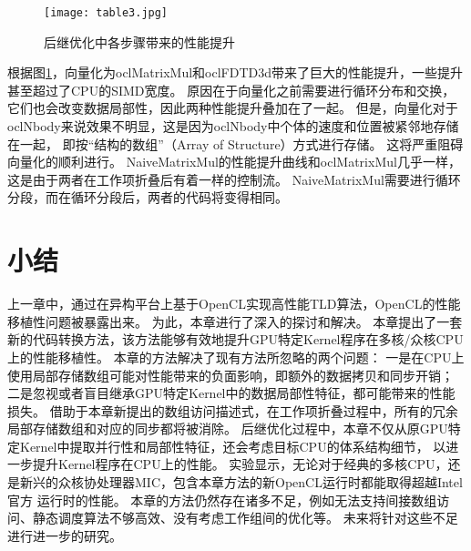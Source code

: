 \begin{figure}[htb]
	\centering
 	\texttt{[image: table3.jpg]}
 	\caption{后继优化中各步骤带来的性能提升}
 	\label{asf}
 \end{figure}

根据图\ref{asf}，向量化为oclMatrixMul和oclFDTD3d带来了巨大的性能提升，一些提升甚至超过了CPU的SIMD宽度。
原因在于向量化之前需要进行循环分布和交换，它们也会改变数据局部性，因此两种性能提升叠加在了一起。
但是，向量化对于oclNbody来说效果不明显，这是因为oclNbody中个体的速度和位置被紧邻地存储在一起，
即按``结构的数组''（Array of Structure）方式进行存储。
这将严重阻碍向量化的顺利进行。
NaiveMatrixMul的性能提升曲线和oclMatrixMul几乎一样，这是由于两者在工作项折叠后有着一样的控制流。
NaiveMatrixMul需要进行循环分段，而在循环分段后，两者的代码将变得相同。

\section{小结}
\label{kernelconclusionsec}
上一章中，通过在异构平台上基于OpenCL实现高性能TLD算法，OpenCL的性能移植性问题被暴露出来。
为此，本章进行了深入的探讨和解决。
本章提出了一套新的代码转换方法，该方法能够有效地提升GPU特定Kernel程序在多核/众核CPU上的性能移植性。
本章的方法解决了现有方法所忽略的两个问题：
一是在CPU上使用局部存储数组可能对性能带来的负面影响，即额外的数据拷贝和同步开销；
二是忽视或者盲目继承GPU特定Kernel中的数据局部性特征，都可能带来的性能损失。
借助于本章新提出的数组访问描述式，在工作项折叠过程中，所有的冗余局部存储数组和对应的同步都将被消除。
后继优化过程中，本章不仅从原GPU特定Kernel中提取并行性和局部性特征，还会考虑目标CPU的体系结构细节，
以进一步提升Kernel程序在CPU上的性能。
实验显示，无论对于经典的多核CPU，还是新兴的众核协处理器MIC，包含本章方法的新OpenCL运行时都能取得超越Intel官方
运行时的性能。
本章的方法仍然存在诸多不足，例如无法支持间接数组访问、静态调度算法不够高效、没有考虑工作组间的优化等。
未来将针对这些不足进行进一步的研究。
 
